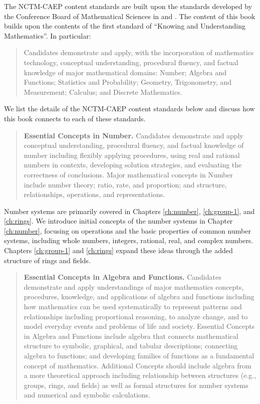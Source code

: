 \documentclass[
]{book}
\theoremstyle{definition}
\theoremstyle{definition}
\theoremstyle{definition}
\theoremstyle{remark}
\begin{document}
The NCTM-CAEP content standards are built upon the standards developed by the Conference Board of Mathematical Sciences in \citeyearpar{MET1} and \citeyearpar{MET2}. The content of this book builds upon the contents of the first standard of ``Knowing and Understanding Mathematics''. In particular:

\begin{quote}
Candidates demonstrate and apply, with the incorporation of mathematics technology, conceptual understanding, procedural fluency, and factual knowledge of major mathematical domains: Number; Algebra and Functions; Statistics and Probability; Geometry, Trigonometry, and Measurement; Calculus; and Discrete Mathematics.
\end{quote}

We list the details of the NCTM-CAEP content standards below and discuss how this book connects to each of these standards.

\begin{quote}
\textbf{Essential Concepts in Number.} Candidates demonstrate and apply conceptual understanding, procedural fluency, and factual knowledge of number including flexibly applying procedures, using real and rational numbers in contexts, developing solution strategies, and evaluating the correctness of conclusions. Major mathematical concepts in Number include number theory; ratio, rate, and proportion; and structure, relationships, operations, and representations.
\end{quote}

Number systems are primarily covered in Chapters \ref{ch:number}, \ref{ch:group-1}, and \ref{ch:rings}. We introduce initial concepts of the number systems in Chapter \ref{ch:number}, focusing on operations and the basic properties of common number systems, including whole numbers, integers, rational, real, and complex numbers. Chapters \ref{ch:group-1} and \ref{ch:rings} expand these ideas through the added structure of rings and fields.

\begin{quote}
\textbf{Essential Concepts in Algebra and Functions.} Candidates demonstrate and apply understandings of major mathematics concepts, procedures, knowledge, and applications of algebra and functions including how mathematics can be used systematically to represent patterns and relationships including proportional reasoning, to analyze change, and to model everyday events and problems of life and society. Essential Concepts in Algebra and Functions include algebra that connects mathematical structure to symbolic, graphical, and tabular descriptions; connecting algebra to functions; and developing families of functions as a fundamental concept of mathematics. Additional Concepts should include algebra from a more theoretical approach including relationship between structures (e.g., groups, rings, and fields) as well as formal structures for number systems and numerical and symbolic calculations.
\end{quote}
\end{document}

